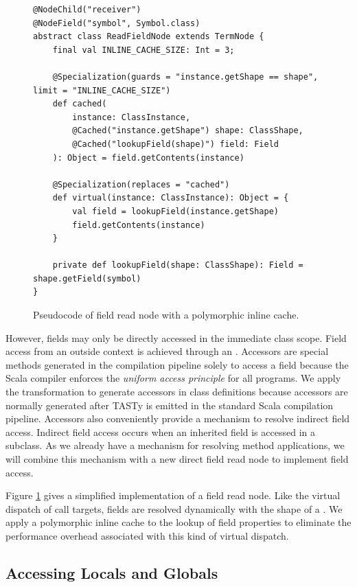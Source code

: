 \begin{figure}[!htb]
\begin{verbatim}
@NodeChild("receiver")
@NodeField("symbol", Symbol.class)
abstract class ReadFieldNode extends TermNode {
	final val INLINE_CACHE_SIZE: Int = 3;
		
	@Specialization(guards = "instance.getShape == shape", limit = "INLINE_CACHE_SIZE")
	def cached(
		instance: ClassInstance,
		@Cached("instance.getShape") shape: ClassShape,
		@Cached("lookupField(shape)") field: Field
	): Object = field.getContents(instance)
		
	@Specialization(replaces = "cached")
	def virtual(instance: ClassInstance): Object = {
		val field = lookupField(instance.getShape)
		field.getContents(instance)
	}

	private def lookupField(shape: ClassShape): Field = shape.getField(symbol)
}
\end{verbatim}
\caption{Pseudocode of field read node with a polymorphic inline cache.}
\label{impl:field-read-node}
\end{figure}

\newpage 

However, fields may only be directly accessed in the immediate class scope.
Field access from an outside context is achieved through an .
Accessors are special methods generated in the compilation pipeline solely to access a field because the Scala compiler enforces the \textit{uniform access principle}\cite{beyer:oo-construction} for all programs.
We apply the transformation to generate accessors in class definitions because accessors are normally generated after TASTy is emitted in the standard Scala compilation pipeline.
Accessors also conveniently provide a mechanism to resolve indirect field access.
Indirect field access occurs when an inherited field is accessed in a subclass.
As we already have a mechanism for resolving method applications, we will combine this mechanism with a new direct field read node to implement field access.

Figure \ref{impl:field-read-node} gives a simplified implementation of a field read node.
Like the virtual dispatch of call targets, fields are resolved dynamically with the shape of a .
We apply a polymorphic inline cache to the lookup of field properties to eliminate the performance overhead associated with this kind of virtual dispatch.

\subsection{Accessing Locals and Globals}

